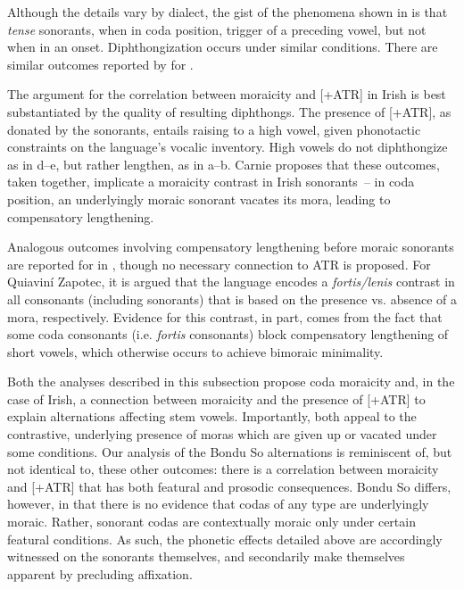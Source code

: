 \documentclass[output=paper,colorlinks,citecolor=brown]{langscibook}
\begin{document}
Although the details vary by dialect, the gist of the phenomena shown in  is that \textit{tense}  sonorants, when in coda position, trigger  of a preceding vowel, but not when in an onset. Diphthongization occurs under similar conditions. There are similar outcomes reported by \citet{Archangelietal2011} for . 

The argument for the correlation between moraicity and [+ATR] in Irish is best substantiated by the quality of resulting diphthongs. The presence of [+ATR], as donated by the sonorants, entails raising to a high vowel, given phonotactic constraints on the language's vocalic inventory. High vowels do not diphthongize as in d--e, but rather lengthen, as in a--b. Carnie proposes that these outcomes, taken together, implicate a moraicity contrast in Irish sonorants~-- in coda position, an underlyingly moraic sonorant vacates its mora, leading to compensatory lengthening. 

\begin{sloppypar}
Analogous outcomes involving compensatory lengthening before moraic sonorants are reported for  in \citet{uchiharabaez2016}, though no necessary connection to ATR is proposed. For Quiaviní Zapotec, it is argued that the language encodes a \textit{fortis/lenis} contrast in all consonants (including sonorants) that is based on the presence vs. absence of a mora, respectively. Evidence for this contrast, in part, comes from the fact that some coda consonants (i.e. \textit{fortis} consonants) block compensatory lengthening of short vowels, which otherwise occurs to achieve bimoraic minimality.
\end{sloppypar}

Both the analyses described in this subsection propose coda moraicity and, in the case of Irish, a connection between moraicity and the presence of [+ATR] to explain alternations affecting stem vowels. Importantly, both appeal to the contrastive, underlying presence of moras which are given up or vacated under some conditions. Our analysis of the Bondu So alternations is reminiscent of, but not identical to, these other outcomes: there is a correlation between moraicity and [+ATR] that has both featural and prosodic consequences. Bondu So differs, however, in that there is no evidence that codas of any type are underlyingly moraic. Rather, sonorant codas are  contextually moraic only under certain featural conditions. As such, the phonetic effects detailed above are accordingly witnessed on the sonorants themselves, and secondarily make themselves apparent by precluding affixation.
\end{document}
